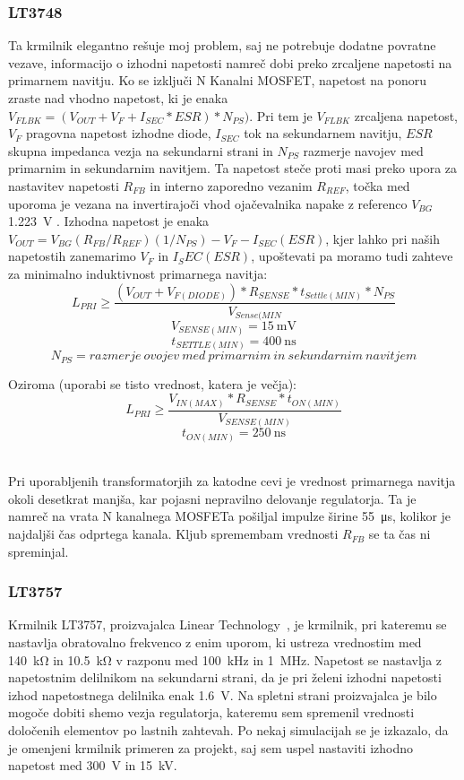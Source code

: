 \documentclass[a4paper,twoside,openright,12pt,Slovene]{book}
\begin{document}
	\subsubsection{LT3748} \label{LT3748}
Ta krmilnik elegantno rešuje moj problem, saj ne potrebuje dodatne povratne vezave, informacijo o izhodni napetosti namreč dobi preko zrcaljene napetosti na primarnem navitju. Ko se izključi N Kanalni MOSFET, napetost na ponoru zraste nad vhodno napetost, ki je enaka \(V_{FLBK} = (V_{OUT} + V_F + I_{SEC} * ESR) * N_{PS}) \). Pri tem je \(V_{FLBK}\) zrcaljena napetost, \(V_F\) pragovna napetost izhodne diode, \(I_{SEC}\) tok na sekundarnem navitju, \(ESR\) skupna impedanca vezja na sekundarni strani in \(N_{PS}\) razmerje navojev med primarnim in sekundarnim navitjem. Ta napetost steče proti masi preko upora za nastavitev napetosti \(R_{FB}\) in interno zaporedno vezanim \(R_{REF}\), točka med uporoma je vezana na invertirajoči vhod ojačevalnika napake z referenco \(V_{BG}\) \SI{1,223}{\volt} \cite{analog:LT3748}. Izhodna napetost je enaka \(V_{OUT} = V_{BG}(R_{FB} / R_{REF})(1 / N_{PS}) - V_F - I_{SEC} (ESR)\), kjer lahko pri naših napetostih zanemarimo \(V_F\) in \(I_SEC (ESR)\), upoštevati pa moramo tudi zahteve za minimalno induktivnost primarnega navitja:
\[L_{PRI} \geq \frac{(V_{OUT}+V_{F(DIODE)}) * R_{SENSE} * t_{Settle(MIN)} * N_{PS}}{V_{Sense(MIN}}\]
\[V_{SENSE(MIN)}=\SI{15}{\milli\volt}\]
\[t_{SETTLE(MIN)}=\SI{400}{\nano\second}\]
\[N_{PS}=razmerje \: ovojev \: med \: primarnim \: in \: sekundarnim \: navitjem \]

Oziroma (uporabi se tisto vrednost, katera je večja):
\[L_{PRI} \geq \frac{V_{IN(MAX)}*R_{SENSE}*t_{ON(MIN)}}{V_{SENSE(MIN)}}\]
\[t_{ON(MIN)}=\SI{250}{\nano\second}\]

~\\Pri uporabljenih transformatorjih za katodne cevi je vrednost primarnega navitja okoli desetkrat manjša, kar pojasni nepravilno delovanje regulatorja. Ta je namreč na vrata N kanalnega MOSFETa pošiljal impulze širine \SI{55}{\micro\second}, kolikor je najdaljši čas odprtega kanala. Kljub spremembam vrednosti \(R_{FB}\) se ta čas ni spreminjal.

	\subsubsection{LT3757} \label{LT3757}
Krmilnik LT3757, proizvajalca Linear Technology~\cite{analog:LT3757}, je krmilnik, pri kateremu se nastavlja obratovalno frekvenco z enim uporom, ki ustreza vrednostim med \SI{140}{\kilo\ohm} in \SI{10.5}{\kilo\ohm} v razponu med \SI{100} {\kilo\hertz} in \SI{1} {\mega\hertz}. Napetost se nastavlja z napetostnim delilnikom na sekundarni strani, da je pri želeni izhodni napetosti izhod napetostnega delilnika enak \SI{1,6} {\volt}. Na spletni strani proizvajalca je bilo mogoče dobiti shemo vezja regulatorja, kateremu sem spremenil vrednosti določenih elementov po lastnih zahtevah. Po nekaj simulacijah se je izkazalo, da je omenjeni krmilnik primeren za projekt, saj sem uspel nastaviti izhodno napetost med \SI{300}{\volt} in \SI{15}{\kilo\volt}. 
\end{document}
